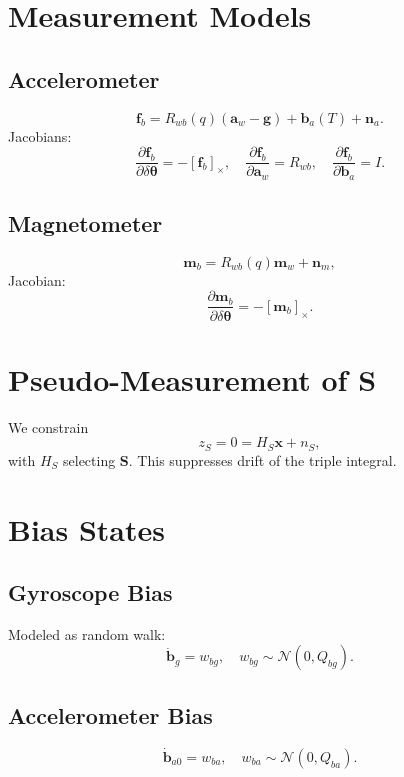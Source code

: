 \documentclass[11pt]{article}
\begin{document}
\section{Measurement Models}
\subsection{Accelerometer}
\begin{equation}
\bm f_b = R_{wb}(q)(\bm a_w - \bm g) + \bm b_a(T) + \bm n_a.
\end{equation}
Jacobians:
\begin{equation}
\frac{\partial \bm f_b}{\partial \delta\bm\theta} = -[\bm f_b]_\times, \quad
\frac{\partial \bm f_b}{\partial \bm a_w} = R_{wb}, \quad
\frac{\partial \bm f_b}{\partial \bm b_a} = I.
\end{equation}

\subsection{Magnetometer}
\begin{equation}
\bm m_b = R_{wb}(q)\bm m_w + \bm n_m,
\end{equation}
Jacobian:
\begin{equation}
\frac{\partial \bm m_b}{\partial \delta\bm\theta} = -[\bm m_b]_\times.
\end{equation}

\section{Pseudo-Measurement of $\bm S$}
We constrain
\begin{equation}
z_S = 0 = H_S \bm x + n_S,
\end{equation}
with $H_S$ selecting $\bm S$.  
This suppresses drift of the triple integral.

\section{Bias States}
\subsection{Gyroscope Bias}
Modeled as random walk:
\begin{equation}
\dot{\bm b}_g = w_{bg}, \quad w_{bg}\sim\mathcal{N}(0,Q_{bg}).
\end{equation}

\subsection{Accelerometer Bias}
\begin{equation}
\dot{\bm b}_{a0} = w_{ba}, \quad w_{ba}\sim\mathcal{N}(0,Q_{ba}).
\end{equation}
\end{document}
